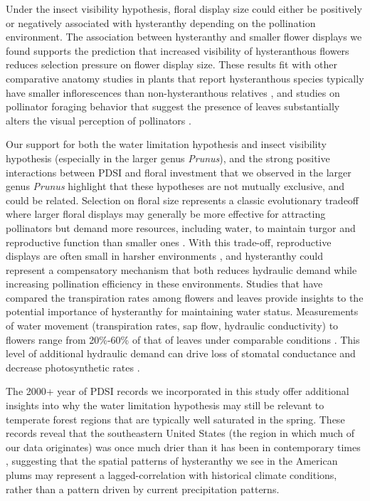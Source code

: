 \documentclass{article}[12pt]
\begin{document}
{Under the insect visibility hypothesis, floral display size could either be positively or negatively associated with hysteranthy depending on the pollination environment. The association between hysteranthy and smaller flower displays we found supports the prediction that increased visibility of hysteranthous flowers reduces selection pressure on flower display size. These results fit with other comparative anatomy studies in plants that report hysteranthous species typically have smaller inflorescences than non-hysteranthous relatives \citep{Gunatilleke1984}, and studies on pollinator foraging behavior that suggest the presence of leaves substantially alters the visual perception of pollinators \citep{Rivest:2017aa,Forrest:2009aa}.%

Our support for both the water limitation hypothesis and insect visibility hypothesis (especially in the larger genus \emph{Prunus}), and the strong positive interactions between PDSI and floral investment that we observed in the larger genus \emph{Prunus} highlight that these hypotheses are not mutually exclusive, and could be related. Selection on floral size represents a classic evolutionary tradeoff where larger floral displays may generally be more effective for attracting pollinators but demand more resources, including water, to maintain turgor and reproductive function than smaller ones \citep{Galen:1999vr,Lambrecht:2007ur}. With this trade-off, reproductive displays are often small in harsher environments \citep{Lambrecht:2013aa,Teixido:2016aa}, and hysteranthy could represent a compensatory mechanism that both reduces hydraulic demand while increasing pollination efficiency in these environments. Studies that have compared the transpiration rates among flowers and leaves provide insights to the potential importance of hysteranthy for maintaining water status. Measurements of water movement (transpiration rates, sap flow, hydraulic conductivity) to flowers range from 20\%-60\% of that of leaves under comparable conditions \citep{Whiley:1988uf,Roddy:2012wn,Liu:2017wg,McMann:2022ww}. This level of additional hydraulic demand can drive loss of stomatal conductance and decrease photosynthetic rates \citep{Galen:1999vr}.
 
The 2000+ year of PDSI records we incorporated in this study offer additional insights into why the water limitation hypothesis may still be relevant to temperate forest regions that are typically well saturated in the spring. These records reveal that the southeastern United States (the region in which much of our data originates) was once much drier than it has been in contemporary times \citep[Fig \ref{fig:timeschange}]{Cook_2010}, suggesting that the spatial patterns of hysteranthy we see in the American plums may represent a lagged-correlation with historical climate conditions, rather than a pattern driven by current precipitation patterns.

}
\end{document}
